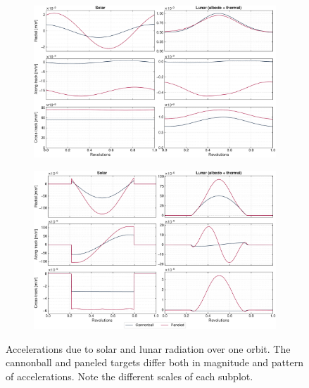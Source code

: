 \begin{figure}[tb]
    \centering
    \begin{subfigure}[c]{\textwidth}
        \includegraphics[width=\textwidth]{figures/plots/acc_solarvslunar_jun.pdf}
        \label{fig:acc-solarvslunar-jun}
     \end{subfigure}

     \bigskip

     \begin{subfigure}[c]{\textwidth}
        \includegraphics[width=\textwidth]{figures/plots/acc_solarvslunar_sep.pdf}
        \label{fig:acc-solarvslunar-sep}
     \end{subfigure}

    \caption{Accelerations due to solar and lunar radiation over one orbit. The cannonball and paneled targets differ both in magnitude and pattern of accelerations. Note the different scales of each subplot.}
    \label{fig:acc-solarvslunar}
\end{figure}


